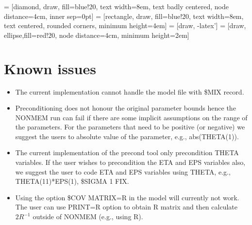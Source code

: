  = [diamond, draw, fill=blue!20, 
    text width=8em, text badly centered, node distance=4cm, inner sep=0pt]
 = [rectangle, draw, fill=blue!20, 
    text width=8em, text centered, rounded corners, minimum height=4em]
 = [draw, -latex']
 = [draw, ellipse,fill=red!20, node distance=4cm,
    minimum height=2em]
    

\section{Known issues}

\begin{itemize}
	\item The current implementation cannot handle the model file with \$MIX record.
	
	\item Preconditioning does not honour the original parameter bounds hence the NONMEM run can fail if there are some implicit assumptions on the range of the parameters. For the parameters that need to be positive (or negative) we suggest the users to absolute value of the parameter, e.g., abs(THETA(1)).
	
	\item The current implementation of the precond tool only precondition THETA variables. If the user wishes to precondition the ETA and EPS variables also, we suggest the user to code ETA and EPS variables using THETA, e.g., THETA(11)*EPS(1), \$SIGMA 1 FIX.
	
	\item Using the option \$COV MATRIX=R in the model will currently not work.  The user can use PRINT=R option to obtain R matrix and then calculate $2R^{-1}$ outside of NONMEM (e.g., using R).
\end{itemize}

